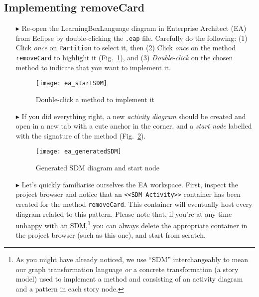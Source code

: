 \newpage
\hypertarget{remCard vis}{}
\subsection{Implementing removeCard}
\visHeader

\begin{itemize}

\item[$\blacktriangleright$] Re-open the LearningBoxLanguage diagram in Enterprise Architect (EA) from Eclipse by double-clicking the \texttt{.eap}
file. Carefully do the following: (1) Click \emph{once} on \texttt{Partition} to select it, then (2) Click \emph{once} on the method
\texttt{removeCard} to highlight it (Fig.~\ref{fig:sdm_start}), and (3) \emph{Double-click} on the chosen method to indicate that you want to implement it.

\begin{figure}[htp]
\begin{center}
  \texttt{[image: ea\_startSDM]}
  \caption{Double-click a method to implement it}  
  \label{fig:sdm_start}
\end{center}
\end{figure}
 
\item[$\blacktriangleright$] If you did everything right, a new \emph{activity diagram} should be created and open in a new tab with a cute anchor in
the corner, and a \emph{start node} labelled with the signature of the method (Fig.~\ref{fig:sdm_skeleton}).  

\begin{figure}[htp]
\begin{center}
 \texttt{[image: ea\_generatedSDM]}
  \caption{Generated SDM diagram and start node}  
  \label{fig:sdm_skeleton}
\end{center}
\end{figure}

\vspace{0.5cm}

\item[$\blacktriangleright$] Let's quickly familiarise ourselves the EA workspace. First, inspect the project browser and notice that an \texttt{<<SDM
Activity>>} container has been created for the method \texttt{removeCard}. This container will eventually host every diagram related to this pattern. Please
note that, if you're at any time unhappy with an SDM,\footnote{As you might have already noticed, we use ``SDM'' interchangeably to mean our graph
transformation language \emph{or} a concrete transformation (a story model) used to implement a method and consisting of an activity diagram and a pattern in
each story node.} you can always delete the appropriate container in the project browser (such as this one), and start from scratch.


\end{itemize}
